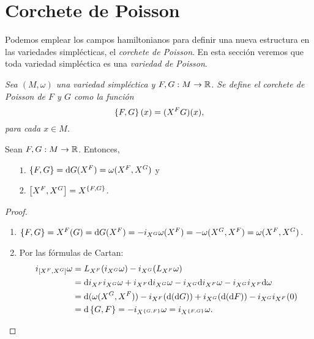 \section{Corchete de Poisson}\label{sec:poisson}
Podemos emplear los campos hamiltonianos para definir una nueva estructura en las variedades simplécticas, el \emph{corchete de Poisson}. En esta sección veremos que toda variedad simpléctica es una \emph{variedad de Poisson}.

\begin{defn}
  \em
  Sea $(M,\omega)$ una variedad simpléctica y $F,G: M \rightarrow \mathbb{R}$. Se define el \emph{corchete de Poisson de $F$ y $G$} como la función
\begin{equation*}
  \left\lbrace F,G\right\rbrace(x) = (X^F G)(x),
\end{equation*}
para cada $x \in M$.
\end{defn}
\begin{prop}\leavevmode
  Sean $F,G:M\rightarrow \mathbb{R}$. Entonces,
  \begin{enumerate}
    \item[$1$.] $\left\lbrace F,G\right\rbrace = \mathrm{d} G (X^F)= \omega(X^F, X^G)$ y
    \item[$2$.] $\left[X^F,X^G\right] = X^{\left\lbrace F,G\right\rbrace}$. \label{proppoisson}
  \end{enumerate}
\end{prop}
\begin{proof}\leavevmode
  \begin{enumerate}
    \item $\left\lbrace F,G\right\rbrace=X^F(G)=\mathrm{d} G(X^F) = -i_{X^G}\omega(X^F)=-\omega(X^G,X^F)=\omega(X^F,X^G)$.
    \item Por las fórmulas de Cartan:
      \begin{align*}
	i_{\left[X^F,X^G\right]} \omega & =  L_{X^F}(i_{X^G}\omega) - i_{X^G}(L_{X^F} \omega) \\ 
	& = \mathrm{d} i_{X^F}i_{X^G}\omega + i_{X^F}\mathrm{d} i_{X^G}\omega - i_{X^G}\mathrm{d} i_{X^F}\omega - i_{X^G}i_{X^F}\mathrm{d} \omega \\
	& = \mathrm{d} (\omega(X^G,X^F)) - i_{X^F}(\mathrm{d}(\mathrm{d} G)) + i_{X^G}(\mathrm{d} (\mathrm{d} F)) - i_{X^G}i_{X^F}(0) \\
	& = \mathrm{d} \left\lbrace G,F\right\rbrace = -i_{X^{\left\lbrace G,F\right\rbrace}}\omega=i_{X^{\left\lbrace F,G\right\rbrace}}\omega.
      \end{align*}
  \end{enumerate}
\end{proof}

